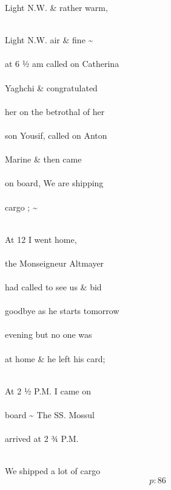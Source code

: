\documentclass{report}
\begin{document}
	\par{
 	Light N.W. \& rather warm,\ \\\ \\
	}

	\par{
 	Light N.W. air \& fine \~{}\ \\\ \\at 6 ½ am called on Catherina\ \\\ \\Yaghchi \& congratulated\ \\\ \\her on the betrothal of her\ \\\ \\son Yousif, called on Anton\ \\\ \\Marine \& then came\ \\\ \\on board, We are shipping\ \\\ \\cargo ; \~{}\ \\\ \\
	}

	\par{
 	At 12 I went home,\ \\\ \\the Monseigneur Altmayer\ \\\ \\had called to see us \& bid\ \\\ \\goodbye as he starts tomorrow\ \\\ \\evening but no one was\ \\\ \\at home \& he left his card;\ \\\ \\
	}

	\par{
 	At 2 ½ P.M. I came on\ \\\ \\board \~{} The SS. Mossul\ \\\ \\arrived at 2 ¾ P.M.\ \\\ \\
	}

	\par{
 	We shipped a lot of cargo\ \\
  \[p: 86 \]

	}
\end{document}
